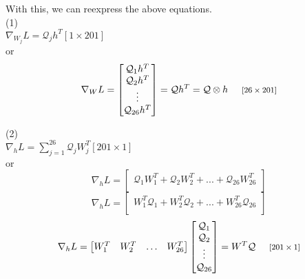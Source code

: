 \documentclass[landscape]{report}
\newcommand{\tab}{\-\hspace{0.5cm}}
\begin{document}
With this, we can reexpress the above equations.\\
(1) \\
\tab$\nabla_{W_j} L = \mathcal{Q}_j h^T $\tab\footnotesize$[1\times201]$\normalsize\\
\tab or
$$ \nabla_{W} L = \begin{bmatrix}
\mathcal{Q}_1 h^T \\
\mathcal{Q}_2 h^T \\
\vdots \\
\mathcal{Q}_{26} h^T \\
\end{bmatrix} = \mathcal{Q}h^T = \mathcal{Q} \otimes h \text{\tab\footnotesize$[26\times201]$\normalsize} $$

(2)\\
\tab$\nabla_{h} L = \sum_{j=1}^{26}{\mathcal{Q}_j W_j^T}$\tab\footnotesize$[201\times1]$\normalsize\\
\tab or
$$ \nabla_{h} L = \begin{bmatrix}
\mathcal{Q}_1 W_1^T + \mathcal{Q}_2 W_2^T + ... + \mathcal{Q}_{26} W_{26}^T\\
\end{bmatrix} $$
$$ \nabla_{h} L = \begin{bmatrix}
W_1^T \mathcal{Q}_1 + W_2^T \mathcal{Q}_2 + ... + W_{26}^T \mathcal{Q}_{26}\\
\end{bmatrix} $$
$$ \nabla_{h} L = \begin{bmatrix}
W_1^T & W_2^T & \hdots & W_{26}^T \\
\end{bmatrix}\begin{bmatrix}
\mathcal{Q}_1 \\
\mathcal{Q}_2 \\
\vdots \\
\mathcal{Q}_{26} \\
\end{bmatrix} = W^T \mathcal{Q} \text{\tab\footnotesize$[201\times1]$\normalsize} $$
\end{document}
